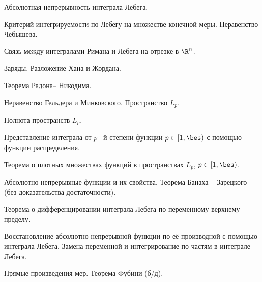 \documentclass[a4paper]{article}
\begin{document}
\begin{nums}{-1}
\item Абсолютная непрерывность интеграла Лебега.
\item Критерий интегрируемости по Лебегу на множестве конечной меры. Неравенство Чебышева.
\item Связь между интегралами Римана и Лебега на отрезке в $\R^n$.
\item Заряды. Разложение Хана и Жордана.
\item Теорема Радона-- Никодима.
\item Неравенство Гельдера и Минковского. Пространство $L_p$.
\item Полнота пространств $L_p$.
\item Представление интеграла от $p$-- й степени функции $p\in [1;\bes)$ с помощью функции распределения.
\item Теорема о плотных множествах функций в пространствах $L_p$, $p\in[1; \bes)$.
\item Абсолютно непрерывные функции и их свойства. Теорема Банаха -- Зарецкого (без доказательства достаточности).
\item Теорема о дифференцировании интеграла Лебега по переменному верхнему пределу.
\item Восстановление абсолютно непрерывной функции по её производной с помощью
интеграла Лебега. Замена переменной и интегрирование по частям в интеграле Лебега.
\item Прямые произведения мер. Теорема Фубини (б/д).
\end{nums}

\medskip\dmvntrail
\end{document}
